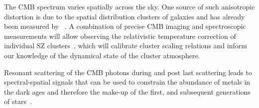 
The CMB spectrum varies spatially across the sky. One source of such anisotropic distortion is due to 
the spatial distribution clusters of galaxies and has already been measured by \planck~\cite{Planck2013SZ}. 
A combination of precise CMB imaging 
and spectroscopic measurements will allow observing the relativistic temperature correction of individual SZ 
clusters~\cite{Sazonov1998,Itoh98,Challinor98}, which will calibrate cluster scaling relations and inform our 
knowledge of the dynamical state of the cluster atmosphere. 

Resonant scattering of the CMB photons during and post last scattering leads to spectral-spatial signals
that can be used to constrain the abundance of metals in the dark ages and therefore the make-up of the 
first, and subsequent generations of stars~\cite{Jose2005, Carlos2007Pol, Lewis2013,Kaustuv2004, Schleicher2008}. 
